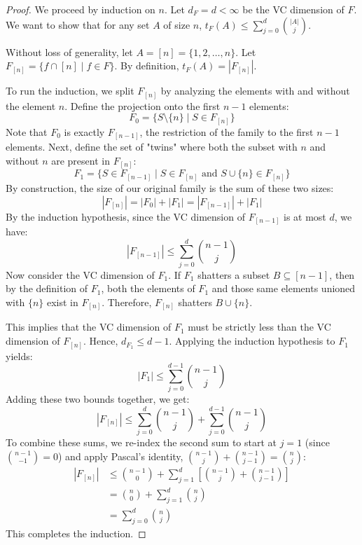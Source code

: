 \documentclass[a4paper]{article}
\begin{document}
\begin{proof}
    We proceed by induction on $n$. Let $d_F = d < \infty$ be the VC dimension of $F$. We want to show that for any set $A$ of size $n$, $t_F(A) \leq \sum_{j=0}^{d} \binom{|A|}{j}$. 
    
    Without loss of generality, let $A = [n] = \{1, 2, \dots, n\}$. Let $F_{[n]} = \{f \cap [n] \mid f \in F\}$. By definition, $t_F(A) = |F_{[n]}|$. 
    
    To run the induction, we split $F_{[n]}$ by analyzing the elements with and without the element $n$. Define the projection onto the first $n-1$ elements:
    \[
        F_0 = \{S \setminus \{n\} \mid S \in F_{[n]}\}
    \]
    Note that $F_0$ is exactly $F_{[n-1]}$, the restriction of the family to the first $n-1$ elements. Next, define the set of "twins" where both the subset with $n$ and without $n$ are present in $F_{[n]}$:
    \[
        F_1 = \{S \in F_{[n-1]} \mid S \in F_{[n]} \text{ and } S \cup \{n\} \in F_{[n]}\}
    \]
    By construction, the size of our original family is the sum of these two sizes:
    \[
        |F_{[n]}| = |F_0| + |F_1| = |F_{[n-1]}| + |F_1|
    \]
    By the induction hypothesis, since the VC dimension of $F_{[n-1]}$ is at most $d$, we have:
    \[
        |F_{[n-1]}| \leq \sum_{j=0}^d \binom{n-1}{j}
    \]
    Now consider the VC dimension of $F_1$. If $F_1$ shatters a subset $B \subseteq [n-1]$, then by the definition of $F_1$, both the elements of $F_1$ and those same elements unioned with $\{n\}$ exist in $F_{[n]}$. Therefore, $F_{[n]}$ shatters $B \cup \{n\}$. 
    
    This implies that the VC dimension of $F_1$ must be strictly less than the VC dimension of $F_{[n]}$. Hence, $d_{F_1} \leq d - 1$. Applying the induction hypothesis to $F_1$ yields:
    \[
        |F_1| \leq \sum_{j=0}^{d-1} \binom{n-1}{j}
    \]
    Adding these two bounds together, we get:
    \[
        |F_{[n]}| \leq \sum_{j=0}^{d} \binom{n-1}{j} + \sum_{j=0}^{d-1} \binom{n-1}{j}
    \]
    To combine these sums, we re-index the second sum to start at $j=1$ (since $\binom{n-1}{-1} = 0$) and apply Pascal's identity, $\binom{n-1}{j} + \binom{n-1}{j-1} = \binom{n}{j}$:
    \begin{align*}
        |F_{[n]}| &\leq \binom{n-1}{0} + \sum_{j=1}^{d} \left[ \binom{n-1}{j} + \binom{n-1}{j-1} \right] \\
        &= \binom{n}{0} + \sum_{j=1}^{d} \binom{n}{j} \\
        &= \sum_{j=0}^{d} \binom{n}{j}
    \end{align*}
    This completes the induction.
\end{proof}
\newpage
\end{document}

